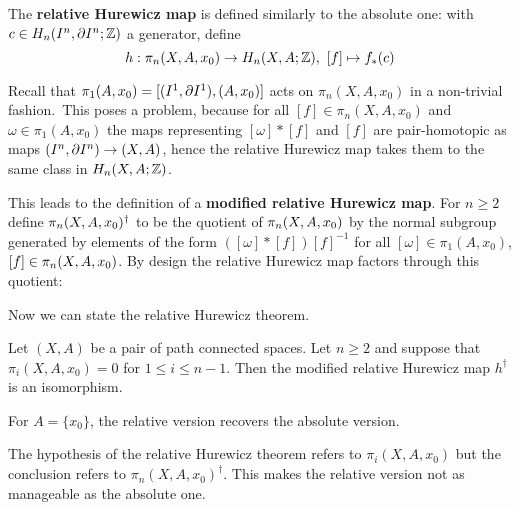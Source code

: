The \textbf{relative Hurewicz map} is defined similarly to the absolute one: with $c\in H_n(I^n,\partial I^n;{\mathbb Z})$ a generator, define
\[h:\pi_n(X,A,x_0)\to H_n(X,A;{\mathbb Z}),\ [f]\mapsto f_*(c)\]


Recall that $\pi_1(A,x_0)=[(I^1,\partial I^1),(A,x_0)]$ acts on $\pi_n(X,A,x_0)$ in a non-trivial fashion.\alvaropls\ This poses a problem, because for all $[f]\in\pi_n(X,A,x_0)$ and $\omega\in\pi_1(A,x_0)$ the maps representing $[\omega]*[f]$ and $[f]$ are pair-homotopic as maps $(I^n,\partial I^n)\to(X,A)$, hence the relative Hurewicz map takes them to the same class in $H_n(X,A;{\mathbb Z})$.

This leads to the definition of a \textbf{modified relative Hurewicz map}. For $n\geq2$ define $\pi_n(X,A,x_0)^\dagger$ to be the quotient of $\pi_n(X,A,x_0)$ by the normal subgroup generated by elements of the form $([\omega]*[f])[f]^{-1}$ for all $[\omega]\in\pi_1(A,x_0)$, $[f]\in\pi_n(X,A,x_0)$. By design the relative Hurewicz map factors through this quotient:
\begin{center}
\end{center}

Now we can state the relative Hurewicz theorem.

\begin{theorem}[Hurewicz]\label{theorem:hurewicz}
Let $(X,A)$ be a pair of path connected spaces. Let $n\geq2$ and suppose that $\pi_i(X,A,x_0)=0$ for $1\leq i\leq n-1$. Then the modified relative Hurewicz map $h^\dagger$ is an isomorphism.
\end{theorem}

\begin{remark}
For $A=\{x_0\}$, the relative version recovers the absolute version.
\end{remark}

\begin{remark}
The hypothesis of the relative Hurewicz theorem refers to $\pi_i(X,A,x_0)$ but the conclusion refers to $\pi_n(X,A,x_0)^\dagger$. This makes the relative version not as manageable as the absolute one.
\end{remark}